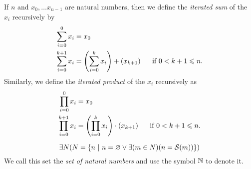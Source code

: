 \newpage
\begin{definition}
    If \(n\) and \(x_0, \dots x_{n - 1}\) are natural numbers,
    then we define the \emph{iterated sum} of the \(x_i\) recursively by
    \begin{align*}
        \sum_{i = 0}^{0}x_i &= x_0\\
        \sum_{i = 0}^{k + 1}x_i &= \pn*{\sum_{i = 0}^{k}x_i} + \pn*{x_{k + 1}}~~~~\text{ if } 0 < k + 1 \leq n.
    \end{align*}
    Similarly, we define the \emph{iterated product} of the \(x_i\) recursively as
    \begin{align*}
        \prod_{i = 0}^{0}x_i &= x_0\\
        \prod_{i = 0}^{k + 1}x_i &= \pn*{\prod_{i = 0}^{k}x_i} \cdot \pn*{x_{k + 1}}~~~~\text{ if } 0 < k + 1 \leq n.
    \end{align*}
\end{definition}

\begin{axiom}[Infinity]
    \vspace{-\abovedisplayskip}
    \[
        \exists N \pn*{N = \set*{n \suchthat n = \emptyset \join \exists\pn*{m \in N}\pn*{n = \successor{m}}}}
    \]
    We call this set the \emph{set of natural numbers} and use the symbol \(\mathbb{N}\) to denote it.
\end{axiom}

\begin{theorem}
\end{theorem}


